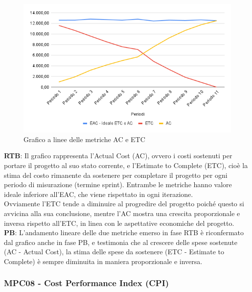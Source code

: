 \documentclass[10pt]{article}
\begin{document}
\begin{justify}
\begin{figure}[H]
  \centering
  \includegraphics[width=0.9\linewidth]{AC-ETC.png}
  \caption{Grafico a linee delle metriche AC e ETC}
  \label{fig:AC-ETCchart}
\end{figure}

\textbf{RTB}: Il grafico rappresenta l'Actual Cost (AC), ovvero i costi sostenuti per portare il progetto al suo stato corrente, e l'Estimate to Complete (ETC), 
cioè la stima del costo rimanente da sostenere per completare il progetto per ogni periodo di misurazione (termine sprint). Entrambe le metriche hanno valore ideale
inferiore all'EAC, che viene rispettato in ogni iterazione.\\
Ovviamente l'ETC tende a diminuire al progredire del progetto poiché questo si avvicina alla sua conclusione, mentre l'AC mostra una crescita proporzionale e inversa 
rispetto all'ETC, in linea con le aspettative economiche del progetto.\\

\noindent
\textbf{PB}: L'andamento lineare delle due metriche emerso in fase RTB è riconfermato dal grafico anche in fase PB, e testimonia che al crescere delle spese sostenute 
(AC - Actual Cost), la stima delle spese da sostenere (ETC - Estimate to Complete) è sempre diminuita in maniera proporzionale e inversa.\\


\subsubsection{MPC08 - Cost Performance Index (CPI)}


\end{justify}
\end{document}
